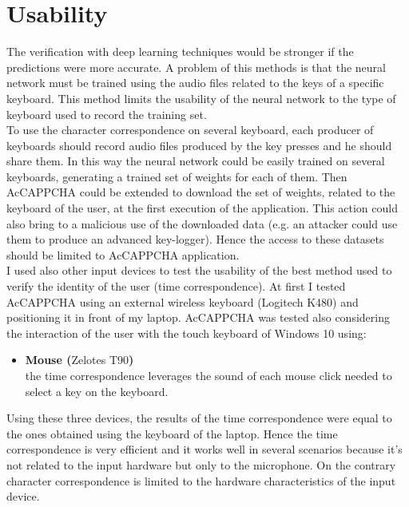\section{Usability}
The verification with deep learning techniques would be stronger if the predictions were more accurate. A problem of this methods is that the neural network must be trained using the audio files related to the keys of a specific keyboard. This method limits the usability of the neural network to the type of keyboard used to record the training set.\\
To use the character correspondence on several keyboard, each producer of keyboards should record audio files produced by the key presses and he should share them. In this way the neural network could be easily trained on several keyboards, generating a trained set of weights for each of them. Then AcCAPPCHA could be extended to download the set of weights, related to the keyboard of the user, at the first execution of the application. This action could also bring to a malicious use of the downloaded data (e.g. an attacker could use them to produce an advanced key-logger). Hence the access to these datasets should be limited to AcCAPPCHA application.\\
I used also other input devices to test the usability of the best method used to verify the identity of the user (time correspondence). At first I tested AcCAPPCHA using an external wireless keyboard (Logitech K480) and positioning it in front of my laptop. AcCAPPCHA was tested also considering the interaction of the user with the touch keyboard of Windows 10 using:
\begin{itemize}
\item{\textbf{Mouse (}Zelotes T90\textbf{)}\\
the time correspondence leverages the sound of each mouse click needed to select a key on the keyboard.}
\end{itemize}
Using these three devices, the results of the time correspondence were equal to the ones obtained using the keyboard of the laptop. Hence the time correspondence is very efficient and it works well in several scenarios because it's not related to the input hardware but only to the microphone. On the contrary character correspondence is limited to the hardware characteristics of the input device. 